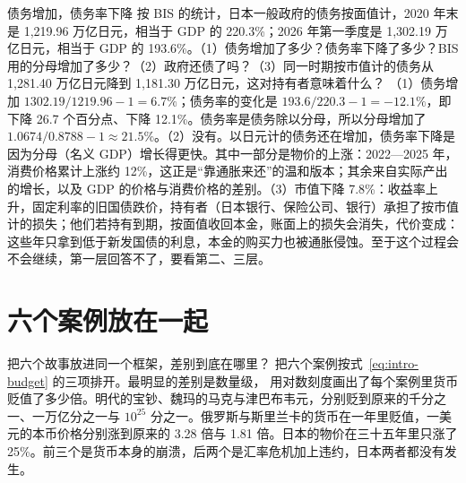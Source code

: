 
\begin{example}{债务增加，债务率下降}\label{ex:intro-ratio}
按 BIS 的统计，日本一般政府的债务按面值计，2020 年末是 1,219.96 万亿日元，相当于 GDP 的 220.3\%；2026 年第一季度是 1,302.19 万亿日元，相当于 GDP 的 193.6\%\cite{bis2026}。（1）债务增加了多少？债务率下降了多少？BIS 用的分母增加了多少？（2）政府还债了吗？（3）同一时期按市值计的债务从 1,281.40 万亿日元降到 1,181.30 万亿日元，这对持有者意味着什么？
\solution （1）债务增加 $1302.19/1219.96-1=6.7\%$；债务率的变化是 $193.6/220.3-1=-12.1\%$，即下降 26.7 个百分点、下降 12.1\%。债务率是债务除以分母，所以分母增加了 $1.0674/0.8788-1\approx21.5\%$。（2）没有。以日元计的债务还在增加，债务率下降是因为分母（名义 GDP）增长得更快。其中一部分是物价的上涨：2022—2025 年，消费价格累计上涨约 12\%，这正是“靠通胀来还”的温和版本；其余来自实际产出的增长，以及 GDP 的价格与消费价格的差别。（3）市值下降 7.8\%：收益率上升，固定利率的旧国债跌价，持有者（日本银行、保险公司、银行）承担了按市值计的损失；他们若持有到期，按面值收回本金，账面上的损失会消失，代价变成：这些年只拿到低于新发国债的利息，本金的购买力也被通胀侵蚀。至于这个过程会不会继续，第一层回答不了，要看第二、三层。
\end{example}

\section{六个案例放在一起}\label{sec:intro-cases}

把六个故事放进同一个框架，差别到底在哪里？ 把六个案例按式~\eqref{eq:intro-budget} 的三项排开。最明显的差别是数量级， 用对数刻度画出了每个案例里货币贬值了多少倍。明代的宝钞、魏玛的马克与津巴布韦元，分别贬到原来的千分之一、一万亿分之一与 $10^{25}$ 分之一。俄罗斯与斯里兰卡的货币在一年里贬值，一美元的本币价格分别涨到原来的 3.28 倍与 1.81 倍。日本的物价在三十五年里只涨了 25\%。前三个是货币本身的崩溃，后两个是汇率危机加上违约，日本两者都没有发生。

